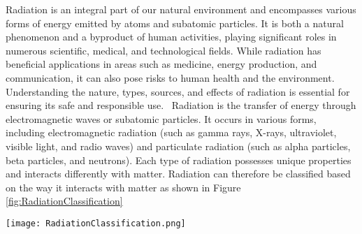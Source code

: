 \documentclass[../../Report.tex]{subfiles}
\begin{document}
    Radiation is an integral part of our natural environment and encompasses various forms of energy emitted by atoms 
    and subatomic particles. It is both a natural phenomenon and a byproduct of human activities, playing significant roles 
    in numerous scientific, medical, and technological fields. While radiation has beneficial applications in areas such as medicine, 
    energy production, and communication, it can also pose risks to human health and the environment. Understanding the nature, types, 
    sources, and effects of radiation is essential for ensuring its safe and responsible use.
    \
    Radiation is the transfer of energy through electromagnetic waves or subatomic particles. It occurs in various forms, 
    including electromagnetic radiation (such as gamma rays, X-rays, ultraviolet, visible light, and radio waves) and 
    particulate radiation (such as alpha particles, beta particles, and neutrons). Each type of radiation possesses unique properties 
    and interacts differently with matter. Radiation can therefore be classified 
    based on the way it interacts with matter as shown in Figure \ref{fig:RadiationClassification}

    \begin{Figure}
        \centering
        \texttt{[image: RadiationClassification.png]}
        \label{fig:RadiationClassification}
    \end{Figure}
\end{document}

